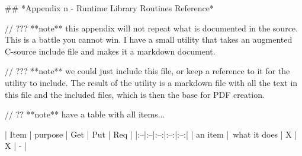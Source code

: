 ## *Appendix n - Runtime Library Routines Reference*

// ??? **note** this appendix will not repeat what is documented in the source. This is a battle you cannot win. I have a small utility that takes an augmented C-source include file and makes it a markdown document. 

// ??? **note** we could just include this file, or keep a reference to it for the utility to include. The result of the utility is a markdown file with all the text in this file and the included files, which is then the base for PDF creation.

// ?? **note** have a table with all items... 

| Item | purpose | Get | Put | Req |
|:--|:--|:--:|:--:|:--:|
| an item | what it does | X | X | - |